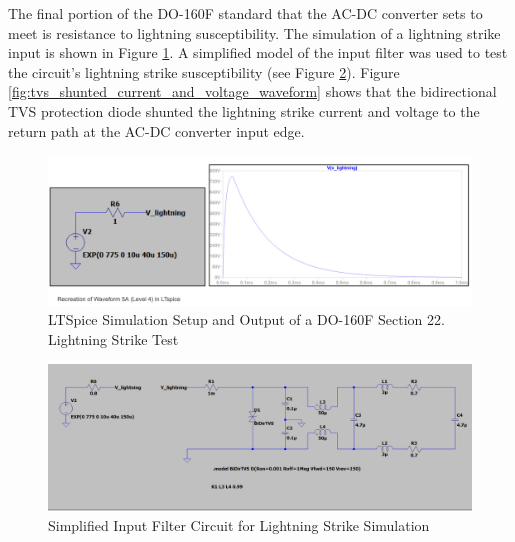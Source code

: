 \documentclass[conference]{IEEEtran}
\begin{document}
The final portion of the DO-160F standard that the AC-DC converter sets to meet is resistance to lightning susceptibility. The simulation of a lightning strike input is shown in Figure \ref{fig:lightning_strike_stimulus_sim_waveform}. A simplified model of the input filter was used to test the circuit's lightning strike susceptibility (see Figure \ref{fig:input_filter_simplified_for_lightning_strike_sim_waveform}). Figure \ref{fig:tvs_shunted_current_and_voltage_waveform} shows that the bidirectional TVS protection diode shunted the lightning strike current and voltage to the return path at the AC-DC converter input edge.

\begin{figure}[h]
    \centering
    \includegraphics[width=1.0\linewidth]{lightning_strike_stimulus_sim.png}
    \caption{LTSpice Simulation Setup and Output of a DO-160F Section 22. Lightning Strike Test}
    \label{fig:lightning_strike_stimulus_sim_waveform}
\end{figure}

\begin{figure}[h]
    \centering
    \includegraphics[width=1.0\linewidth]{input_filter_simplified_for_lightning_strike_sim.png}
    \caption{Simplified Input Filter Circuit for Lightning Strike Simulation}
    \label{fig:input_filter_simplified_for_lightning_strike_sim_waveform}
\end{figure}
\end{document}
